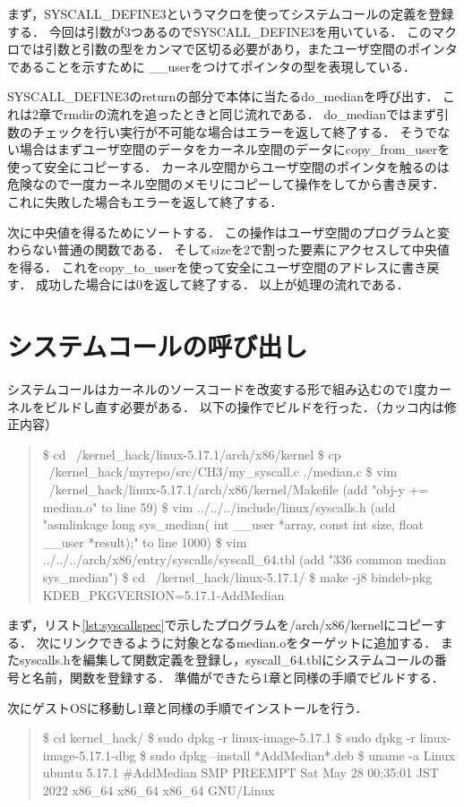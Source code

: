 まず，SYSCALL\_DEFINE3というマクロを使ってシステムコールの定義を登録する．
今回は引数が3つあるのでSYSCALL\_DEFINE3を用いている．
このマクロでは引数と引数の型をカンマで区切る必要があり，またユーザ空間のポインタであることを示すために
\_\_userをつけてポインタの型を表現している．

SYSCALL\_DEFINE3のreturnの部分で本体に当たるdo\_medianを呼び出す．
これは2章でrmdirの流れを追ったときと同じ流れである．
do\_medianではまず引数のチェックを行い実行が不可能な場合はエラーを返して終了する．
そうでない場合はまずユーザ空間のデータをカーネル空間のデータにcopy\_from\_userを使って安全にコピーする．
カーネル空間からユーザ空間のポインタを触るのは危険なので一度カーネル空間のメモリにコピーして操作をしてから書き戻す．
これに失敗した場合もエラーを返して終了する．

次に中央値を得るためにソートする．
この操作はユーザ空間のプログラムと変わらない普通の関数である．
そしてsizeを2で割った要素にアクセスして中央値を得る．
これをcopy\_to\_userを使って安全にユーザ空間のアドレスに書き戻す．
成功した場合には0を返して終了する．
以上が処理の流れである．

\section{システムコールの呼び出し}
システムコールはカーネルのソースコードを改変する形で組み込むので1度カーネルをビルドし直す必要がある．
以下の操作でビルドを行った．（カッコ内は修正内容）
\begin{quote}
\$ cd ~/kernel\_hack/linux-5.17.1/arch/x86/kernel
\$ cp ~/kernel\_hack/myrepo/src/CH3/my\_syscall.c  ./median.c
\$ vim ~/kernel\_hack/linux-5.17.1/arch/x86/kernel/Makefile (add "obj-y           += median.o" to line 59)
\$ vim ../../../include/linux/syscalls.h (add "asmlinkage long sys\_median( int \_\_user *array, const int size, float \_\_user *result);" to line 1000)
\$ vim ../../../arch/x86/entry/syscalls/syscall\_64.tbl (add "336 common  median         sys\_median")
\$ cd ~/kernel\_hack/linux-5.17.1/
\$ make -j8 bindeb-pkg  KDEB\_PKGVERSION=5.17.1-AddMedian
\end{quote}

まず，リスト\ref{lst:syscallspec}で示したプログラムを/arch/x86/kernelにコピーする．
次にリンクできるように対象となるmedian.oをターゲットに追加する．
またsyscalls.hを編集して関数定義を登録し，syscall\_64.tblにシステムコールの番号と名前，関数を登録する．
準備ができたら1章と同様の手順でビルドする．

次にゲストOSに移動し1章と同様の手順でインストールを行う．
\begin{quote}
\$ cd kernel\_hack/
\$ sudo dpkg -r linux-image-5.17.1
\$ sudo dpkg -r linux-image-5.17.1-dbg
\$ sudo dpkg --install *AddMedian*.deb
\$ uname -a
Linux ubuntu 5.17.1 \#AddMedian SMP PREEMPT Sat May 28 00:35:01 JST 2022 x86\_64 x86\_64 x86\_64 GNU/Linux
\end{quote}

